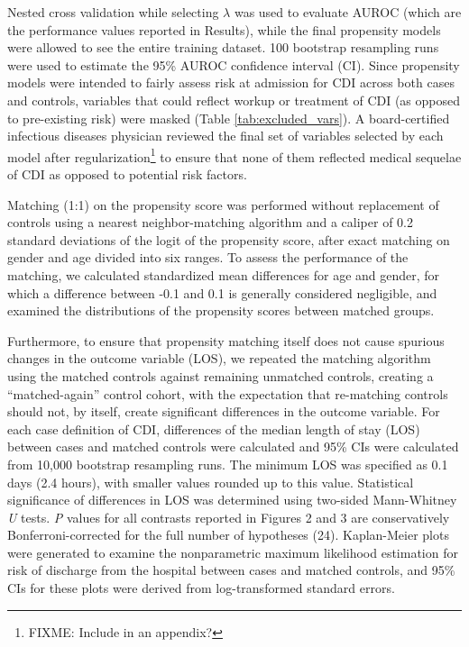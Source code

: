 Nested cross validation while selecting $\lambda$ was used to evaluate AUROC (which are the performance values reported in Results), while the final propensity models were allowed to see the entire training dataset. 100 bootstrap resampling runs were used to estimate the 95\% AUROC confidence interval (CI). Since propensity models were intended to fairly assess risk at admission for CDI across both cases and controls, variables that could reflect workup or treatment of CDI (as opposed to pre-existing risk) were masked (Table \ref{tab:excluded_vars}). A board-certified infectious diseases physician reviewed the final set of variables selected by each model after regularization\footnote{FIXME: Include in an appendix?} to ensure that none of them reflected medical sequelae of CDI as opposed to potential risk factors.

Matching (1:1) on the propensity score was performed without replacement of controls using a nearest neighbor-matching algorithm and a caliper of 0.2 standard deviations of the logit of the propensity score,\autocite{Austin2011} after exact matching on gender and age divided into six ranges. To assess the performance of the matching, we calculated standardized mean differences\autocite{Austin2011} for age and gender, for which a difference between -0.1 and 0.1 is generally considered negligible,\autocite{Haukoos2015} and examined the distributions of the propensity scores between matched groups.

Furthermore, to ensure that propensity matching itself does not cause spurious changes in the outcome variable (LOS), we repeated the matching algorithm using the matched controls against remaining unmatched controls, creating a “matched-again” control cohort, with the expectation that re-matching controls should not, by itself, create significant differences in the outcome variable. For each case definition of CDI, differences of the median length of stay (LOS) between cases and matched controls were calculated and 95\% CIs were calculated from 10,000 bootstrap resampling runs. The minimum LOS was specified as 0.1 days (2.4 hours), with smaller values rounded up to this value. Statistical significance of differences in LOS was determined using two-sided Mann-Whitney \emph{U} tests. \emph{P} values for all contrasts reported in Figures 2 and 3 are conservatively Bonferroni-corrected for the full number of hypotheses (24). Kaplan-Meier plots were generated to examine the nonparametric maximum likelihood estimation for risk of discharge from the hospital between cases and matched controls, and 95\% CIs for these plots were derived from log-transformed standard errors.

